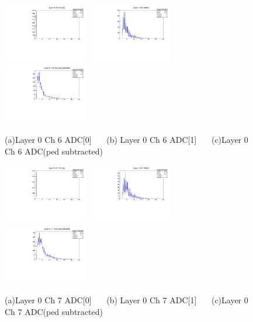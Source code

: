 \documentclass[a4paper,11pt]{article}
\theoremstyle{mytheor}
\begin{document}
\clearpage 
\begin{figure}[H] 
\vspace*{-0.3cm} 
\includegraphics[width=0.33\textwidth,scale=0.5,trim=0 0 0 0,clip]{plotsdir/file0_muons-Layer0_Ch6_adc0-1.pdf} 
\includegraphics[width=0.33\textwidth,scale=0.5,trim=0 0 0 0,clip]{plotsdir/file0_muons-Layer0_Ch6_adc1-1.pdf} 
\includegraphics[width=0.33\textwidth,scale=0.5,trim=0 0 0 0,clip]{plotsdir/file0_muons-Layer0_Ch6_adcPedsub-1.pdf} 
\caption{(a)Layer 0 Ch 6 ADC[0] ~~~(b) Layer 0 Ch 6 ADC[1] ~~~(c)Layer 0 Ch 6 ADC(ped subtracted) } 
\end{figure} 
\begin{figure}[H] 
\vspace*{-0.3cm} 
\includegraphics[width=0.33\textwidth,scale=0.5,trim=0 0 0 0,clip]{plotsdir/file0_muons-Layer0_Ch7_adc0-1.pdf} 
\includegraphics[width=0.33\textwidth,scale=0.5,trim=0 0 0 0,clip]{plotsdir/file0_muons-Layer0_Ch7_adc1-1.pdf} 
\includegraphics[width=0.33\textwidth,scale=0.5,trim=0 0 0 0,clip]{plotsdir/file0_muons-Layer0_Ch7_adcPedsub-1.pdf} 
\caption{(a)Layer 0 Ch 7 ADC[0] ~~~(b) Layer 0 Ch 7 ADC[1] ~~~(c)Layer 0 Ch 7 ADC(ped subtracted) } 
\end{figure} 
\end{document}

